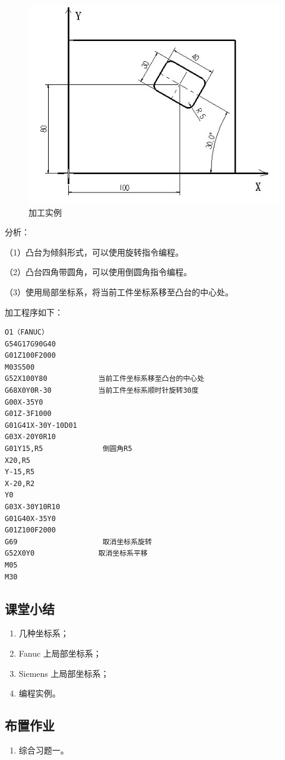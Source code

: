 	\begin{figure}
	\centering
	\includegraphics[width=0.9\linewidth,trim=0 0 0 0,clip]{data/image/29-2}
	\caption{加工实例}
	\label{fig:29-2}
\end{figure}

分析：

（1）凸台为倾斜形式，可以使用旋转指令编程。

（2）凸台四角带圆角，可以使用倒圆角指令编程。

（3）使用局部坐标系，将当前工件坐标系移至凸台的中心处。

加工程序如下：

\begin{lstlisting}
O1（FANUC）
G54G17G90G40
G01Z100F2000
M03S500
G52X100Y80            当前工件坐标系移至凸台的中心处
G68X0Y0R-30           当前工件坐标系顺时针旋转30度
G00X-35Y0
G01Z-3F1000            
G01G41X-30Y-10D01
G03X-20Y0R10
G01Y15,R5              倒圆角R5
X20,R5
Y-15,R5
X-20,R2
Y0
G03X-30Y10R10
G01G40X-35Y0
G01Z100F2000
G69                    取消坐标系旋转
G52X0Y0               取消坐标系平移
M05
M30
\end{lstlisting}


\subsection{课堂小结}
\begin{enumerate}[1、]
\item 几种坐标系；
\item Fanuc 上局部坐标系；
\item Siemens 上局部坐标系；
\item 编程实例。
\end{enumerate}

\vfill
\subsection{布置作业}
\begin{enumerate}[1、]
	\item 综合习题一。
\end{enumerate}
\vfill
